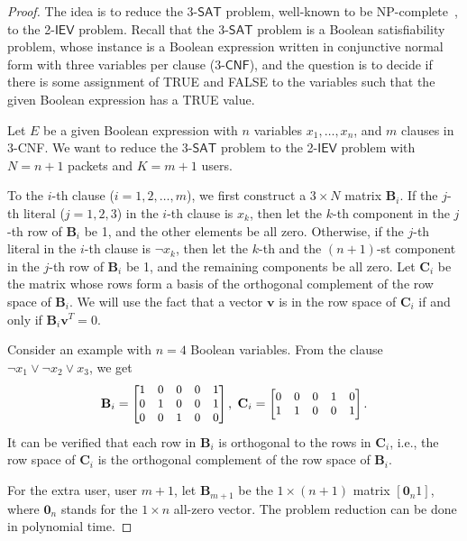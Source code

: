 \documentclass[letterpaper,conference,10pt]{IEEEtran}
\begin{document}
\begin{proof}
The idea is to reduce the 3-$\mathsf{SAT}$ problem, well-known to be NP-complete~\cite{GareyJohnson}, to the 2-$\mathsf{IEV}$ problem. Recall that the 3-$\mathsf{SAT}$ problem is a Boolean satisfiability problem, whose instance is a Boolean expression written in conjunctive normal form with three variables per clause (3-$\mathsf{CNF}$), and the question is to decide if there is some assignment of TRUE and FALSE to the variables such that the given Boolean expression has a TRUE value.

Let $E$ be a given Boolean expression with $n$ variables $x_1,\ldots, x_n$, and $m$ clauses in 3-CNF. We want to reduce the 3-$\mathsf{SAT}$ problem to the 2-$\mathsf{IEV}$ problem with $N=n+1$ packets and $K=m+1$ users.


To the $i$-th clause ($i=1, 2, \ldots, m$), we first construct a $3\times N$ matrix $\mathbf{B}_i$. If the $j$-th literal ($j=1,2,3$) in the $i$-th clause is $x_k$, then let the $k$-th component in the $j$-th row of $\mathbf{B}_i$ be 1, and the other elements be all zero. Otherwise, if the $j$-th literal in the $i$-th clause is $\neg x_k$, then let the $k$-th and the $(n+1)$-st component in the $j$-th row of $\mathbf{B}_i$ be 1, and the remaining components be all zero. Let $\mathbf{C}_i$ be the matrix whose rows form a basis of the orthogonal complement of the row space of $\mathbf{B}_i$. We will use the fact that a vector $\mathbf{v}$ is in the row space of $\mathbf{C}_i$ if and only if $\mathbf{B}_i \mathbf{v}^T = 0$.

Consider an example with $n=4$ Boolean variables. From the clause $\neg x_1 \vee \neg x_2 \vee  x_3$, we get
\[\small \mathbf{B}_i =
\begin{bmatrix}
1& 0& 0& 0& 1 \\
0& 1& 0& 0& 1 \\
0& 0& 1& 0& 0
\end{bmatrix}, \
 \mathbf{C}_i = \begin{bmatrix}
 0 & 0 & 0 & 1 & 0 \\
 1 & 1 & 0 & 0 & 1
 \end{bmatrix}.
\]
It can be verified that each row in $\mathbf{B}_i$ is orthogonal to the rows in $\mathbf{C}_i$, i.e.,
the row space of $\mathbf{C}_i$ is the orthogonal complement of the row space of $\mathbf{B}_i$.

For the extra user, user $m+1$, let $\mathbf{B}_{m+1}$ be the $1\times (n+1)$ matrix $[\mathbf{0}_n 1]$, where $\mathbf{0}_n$ stands for the $1\times n$  all-zero vector. The problem reduction can be done in polynomial time.


\end{proof}
\end{document}
